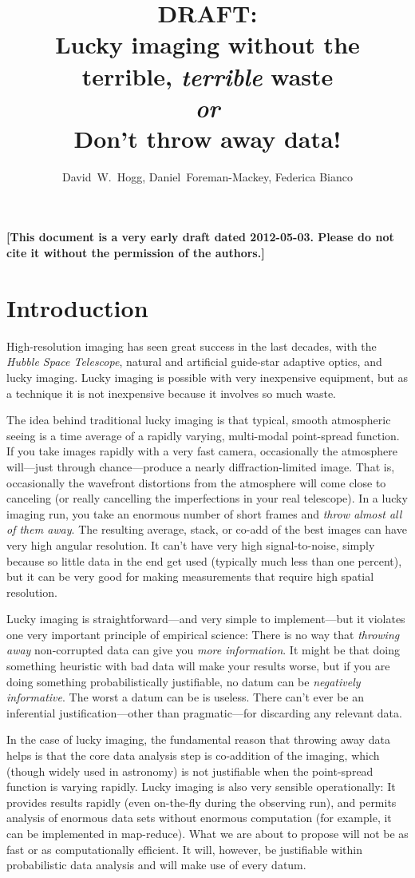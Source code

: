 \documentclass[12pt,preprint]{aastex}
\title{DRAFT: \\
  Lucky imaging without the terrible, \emph{terrible} waste \\
  \textit{or} \\
  Don't throw away data!}
\author{
  David~W.~Hogg\altaffilmark{\ref{CCPP},\ref{MPIA},\ref{email}},
  Daniel~Foreman-Mackey\altaffilmark{\ref{CCPP}},
  Federica Bianco\altaffilmark{\ref{CCPP},\ref{LCOGT}}
}
\newcommand{\project}[1]{\textsl{#1}}
\begin{document}
\textbf{[This document is a very early draft dated 2012-05-03.  Please do not cite it without the permission of the authors.]}

\section{Introduction}

High-resolution imaging has seen great success in the last decades,
with the \project{Hubble Space Telescope}, natural and artificial
guide-star adaptive optics, and lucky imaging.  Lucky imaging is
possible with very inexpensive equipment, but as a technique it is not
inexpensive because it involves so much waste.

The idea behind traditional lucky imaging is that typical, smooth
atmospheric seeing is a time average of a rapidly varying, multi-modal
point-spread function.  If you take images rapidly with a very fast
camera, occasionally the atmosphere will---just through
chance---produce a nearly diffraction-limited image.  That is,
occasionally the wavefront distortions from the atmosphere will come
close to canceling (or really cancelling the imperfections in your
real telescope).  In a lucky imaging run, you take an enormous number
of short frames and \emph{throw almost all of them away}.  The
resulting average, stack, or co-add of the best images can have very
high angular resolution.  It can't have very high signal-to-noise,
simply because so little data in the end get used (typically much less
than one percent), but it can be very good for making measurements
that require high spatial resolution.

Lucky imaging is straightforward---and very simple to implement---but
it violates one very important principle of empirical science: There
is no way that \emph{throwing away} non-corrupted data can give you
\emph{more information}.  It might be that doing something heuristic
with bad data will make your results worse, but if you are doing
something probabilistically justifiable, no datum can be
\emph{negatively informative}.  The worst a datum can be is useless.
There can't ever be an inferential justification---other than
pragmatic---for discarding any relevant data.

In the case of lucky imaging, the fundamental reason that throwing
away data helps is that the core data analysis step is co-addition of
the imaging, which (though widely used in astronomy) is not
justifiable when the point-spread function is varying rapidly.  Lucky
imaging is also very sensible operationally: It provides results
rapidly (even on-the-fly during the observing run), and permits
analysis of enormous data sets without enormous computation (for
example, it can be implemented in map-reduce).  What we are about to
propose will not be as fast or as computationally efficient.  It will,
however, be justifiable within probabilistic data analysis and will
make use of every datum.
\end{document}
